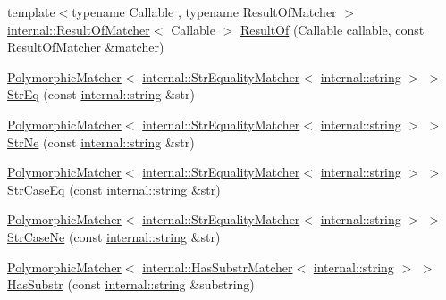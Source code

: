 \begin{DoxyCompactItemize}
\item 
{\footnotesize template$<$typename Callable , typename Result\+Of\+Matcher $>$ }\\\hyperlink{classtesting_1_1internal_1_1_result_of_matcher}{internal\+::\+Result\+Of\+Matcher}$<$ Callable $>$ \hyperlink{namespacetesting_aaadb51dd383baa95f123ab891d4f8a5f}{Result\+Of} (Callable callable, const Result\+Of\+Matcher \&matcher)
\item 
\hyperlink{classtesting_1_1_polymorphic_matcher}{Polymorphic\+Matcher}$<$ \hyperlink{classtesting_1_1internal_1_1_str_equality_matcher}{internal\+::\+Str\+Equality\+Matcher}$<$ \hyperlink{namespacetesting_1_1internal_a8e8ff5b11e64078831112677156cb111}{internal\+::string} $>$ $>$ \hyperlink{namespacetesting_a154de81376ae7d584c6e5a619b45fb09}{Str\+Eq} (const \hyperlink{namespacetesting_1_1internal_a8e8ff5b11e64078831112677156cb111}{internal\+::string} \&str)
\item 
\hyperlink{classtesting_1_1_polymorphic_matcher}{Polymorphic\+Matcher}$<$ \hyperlink{classtesting_1_1internal_1_1_str_equality_matcher}{internal\+::\+Str\+Equality\+Matcher}$<$ \hyperlink{namespacetesting_1_1internal_a8e8ff5b11e64078831112677156cb111}{internal\+::string} $>$ $>$ \hyperlink{namespacetesting_a6f6b8af3d19cb969df0eb995c47a14d2}{Str\+Ne} (const \hyperlink{namespacetesting_1_1internal_a8e8ff5b11e64078831112677156cb111}{internal\+::string} \&str)
\item 
\hyperlink{classtesting_1_1_polymorphic_matcher}{Polymorphic\+Matcher}$<$ \hyperlink{classtesting_1_1internal_1_1_str_equality_matcher}{internal\+::\+Str\+Equality\+Matcher}$<$ \hyperlink{namespacetesting_1_1internal_a8e8ff5b11e64078831112677156cb111}{internal\+::string} $>$ $>$ \hyperlink{namespacetesting_addbdb8c0902ab09cade24fa6db7c0073}{Str\+Case\+Eq} (const \hyperlink{namespacetesting_1_1internal_a8e8ff5b11e64078831112677156cb111}{internal\+::string} \&str)
\item 
\hyperlink{classtesting_1_1_polymorphic_matcher}{Polymorphic\+Matcher}$<$ \hyperlink{classtesting_1_1internal_1_1_str_equality_matcher}{internal\+::\+Str\+Equality\+Matcher}$<$ \hyperlink{namespacetesting_1_1internal_a8e8ff5b11e64078831112677156cb111}{internal\+::string} $>$ $>$ \hyperlink{namespacetesting_a9596fd67bdd5df195bc54382f91a1906}{Str\+Case\+Ne} (const \hyperlink{namespacetesting_1_1internal_a8e8ff5b11e64078831112677156cb111}{internal\+::string} \&str)
\item 
\hyperlink{classtesting_1_1_polymorphic_matcher}{Polymorphic\+Matcher}$<$ \hyperlink{classtesting_1_1internal_1_1_has_substr_matcher}{internal\+::\+Has\+Substr\+Matcher}$<$ \hyperlink{namespacetesting_1_1internal_a8e8ff5b11e64078831112677156cb111}{internal\+::string} $>$ $>$ \hyperlink{namespacetesting_a7d27682e38d57eea81ba145a2772e1c7}{Has\+Substr} (const \hyperlink{namespacetesting_1_1internal_a8e8ff5b11e64078831112677156cb111}{internal\+::string} \&substring)

\end{DoxyCompactItemize}
